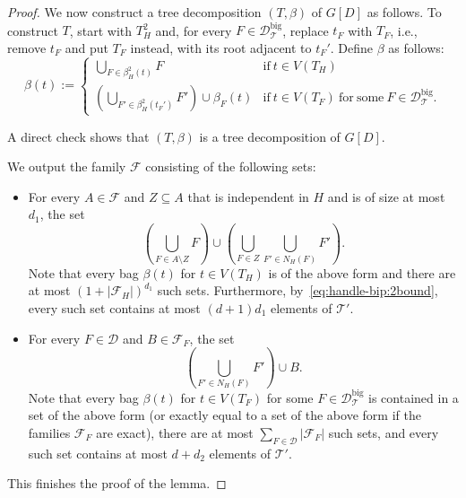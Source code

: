 \documentclass[10pt,a4paper]{amsart}
\def\T{\mathcal{T}}
\begin{document}
\begin{proof}
We now construct a tree decomposition $(T,\beta)$ of $G[D]$ as follows. 
To construct $T$, start with $T_H^2$ and, for every $F \in \mathcal{D}^\mathrm{big}_\T$, replace $t_F$ with $T_F$, i.e., 
   remove $t_F$ and put $T_F$ instead, with its root adjacent to $t_F'$.
Define $\beta$ as follows:
\[ \beta(t) := \begin{cases} \bigcup_{F \in \beta_H^2(t)} F & \mathrm{if}\ t \in V(T_H) \\
                \left( \bigcup_{F' \in \beta_H^2(t_F')} F' \right) \cup \beta_F(t) & \mathrm{if}\ t \in V(T_F)\ \mathrm{for\ some\ }F \in \mathcal{D}^\mathrm{big}_\T.\end{cases} \]

A direct check shows that $(T,\beta)$ is a tree decomposition of $G[D]$. 

We output the family $\mathcal{F}$ consisting of the following sets:
\begin{itemize}
 \item For every $A \in \mathcal{F}$ and $Z \subseteq A$ that is independent in $H$ and is of size at most $d_1$, the set 
    \[ \left(\bigcup_{F \in A \setminus Z} F\right) \cup  \left(\bigcup_{F \in Z} \bigcup_{F' \in N_H(F)} F' \right). \]
    Note that every bag $\beta(t)$ for $t \in V(T_H)$ is of the above form and there are at most $(1+|\mathcal{F}_H|)^{d_1}$ such sets.
    Furthermore, by~\eqref{eq:handle-bip:2bound}, every such set contains at most
    $(d+1)d_1$ elements of $\T'$. 
 \item For every $F \in \mathcal{D}$ and $B \in \mathcal{F}_F$, the set 
    \[ \left( \bigcup_{F' \in N_H(F)} F' \right) \cup B. \]
    Note that every bag $\beta(t)$ for $t \in V(T_F)$ for some $F \in \mathcal{D}^\mathrm{big}_\T$ is contained in a set of the above form
    (or exactly equal to a set of the above form if the families $\mathcal{F}_F$ are exact),
    there are at most $\sum_{F \in \mathcal{D}} |\mathcal{F}_F|$ such sets,
    and every such set contains at most $d + d_2$ elements of $\T'$.
\end{itemize}
 This finishes the proof of the lemma.
\end{proof}
\end{document}
